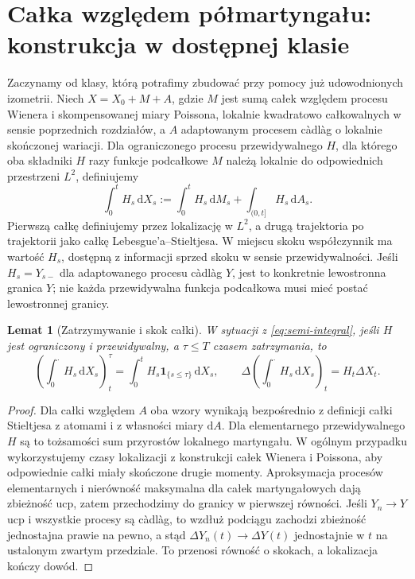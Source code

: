 \documentclass[11pt,a4paper,oneside]{report}
\numberwithin{equation}{chapter}
\theoremstyle{plain}
\newtheorem{lemat}[twierdzenie]{Lemat}
\theoremstyle{definition}
\theoremstyle{remark}
\newcommand{\ind}[1]{\mathbf{1}_{#1}}
\newcommand{\dd}{\mathrm{d}}
\begin{document}
\section{Całka względem półmartyngału: konstrukcja w dostępnej klasie}

Zaczynamy od klasy, którą potrafimy zbudować przy pomocy
już udowodnionych izometrii. Niech $X=X_0+M+A$, gdzie
$M$ jest sumą całek względem procesu Wienera i
skompensowanej miary Poissona, lokalnie kwadratowo
całkowalnych w sensie poprzednich rozdziałów, a $A$
adaptowanym procesem càdlàg o lokalnie skończonej wariacji.
Dla ograniczonego procesu przewidywalnego $H$, dla którego
oba składniki $H$ razy funkcje podcałkowe $M$ należą lokalnie
do odpowiednich przestrzeni $L^2$, definiujemy
\[
\int_0^t H_s\,\dd X_s
:=\int_0^tH_s\,\dd M_s+\int_{(0,t]}H_s\,\dd A_s.
\tag{12.1}\label{eq:semi-integral}
\]
Pierwszą całkę definiujemy przez lokalizację w $L^2$,
a drugą trajektoria po trajektorii jako całkę Lebesgue'a--Stieltjesa.
W miejscu skoku współczynnik ma wartość $H_s$, dostępną
z informacji sprzed skoku w sensie przewidywalności. Jeśli
$H_s=Y_{s-}$ dla adaptowanego procesu càdlàg $Y$, jest to
konkretnie lewostronna granica $Y$; nie każda przewidywalna
funkcja podcałkowa musi mieć postać lewostronnej granicy.

\begin{lemat}[Zatrzymywanie i skok całki]
\label{lem:semi-jumps}
W sytuacji z \eqref{eq:semi-integral}, jeśli $H$ jest
ograniczony i przewidywalny, a $\tau\le T$ czasem zatrzymania,
to
\[
\left(\int_0^\cdot H_s\,\dd X_s\right)^\tau_t
=\int_0^tH_s\ind{\{s\le\tau\}}\,\dd X_s,
\qquad
\Delta\left(\int_0^\cdot H_s\,\dd X_s\right)_t
=H_t\Delta X_t.
\]
\end{lemat}
\begin{proof}
Dla całki względem $A$ oba wzory wynikają bezpośrednio
z definicji całki Stieltjesa z atomami i z własności
miary $\dd A$. Dla elementarnego przewidywalnego $H$
są to tożsamości sum przyrostów lokalnego martyngału.
W ogólnym przypadku wykorzystujemy czasy lokalizacji z konstrukcji
całek Wienera i Poissona, aby odpowiednie całki miały skończone
drugie momenty. Aproksymacja
procesów elementarnych i nierówność maksymalna dla
całek martyngałowych dają zbieżność ucp, zatem
przechodzimy do granicy w pierwszej równości.
Jeśli $Y_n\to Y$ ucp i wszystkie procesy są càdlàg,
to wzdłuż podciągu zachodzi zbieżność jednostajna
prawie na pewno, a stąd $\Delta Y_n(t)\to\Delta Y(t)$
jednostajnie w $t$ na ustalonym zwartym przedziale.
To przenosi równość o skokach, a lokalizacja kończy dowód.
\end{proof}
\end{document}
